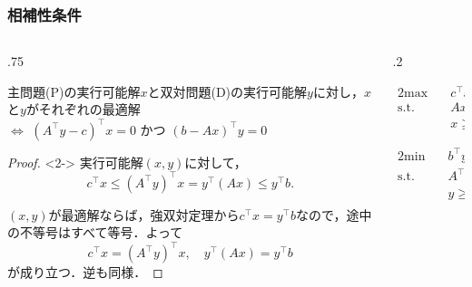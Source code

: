 \documentclass[14pt,aspectratio=169,xcolor=dvipsnames,table,onlytextwidth,dvipdfmx]{beamer}
\begin{document}
\begin{frame}
    \frametitle{相補性条件}

    \small
    \begin{columns}[T]
    \begin{column}{.75\textwidth}
    \begin{lemma}
        主問題(P)の実行可能解$x$と双対問題(D)の実行可能解$y$に対し，$x$と$y$がそれぞれの最適解 \\ 
        $\iff$ 
            $(A^\top y - c)^\top x = 0$
            かつ 
            $(b - Ax)^\top y = 0$  
    \end{lemma}

    \begin{proof}<2->
    実行可能解$(x,y)$に対して，
    \setlength{\abovedisplayskip}{4pt}
    \setlength{\belowdisplayskip}{4pt}
    \[
        c^\top x \leq (A^\top y)^\top x = y^\top (Ax) \leq y^\top b.
    \]
    
    \bigskip
    $(x,y)$が最適解ならば，強双対定理から$c^\top x = y^\top b$なので，途中の不等号はすべて等号．よって
    \[
        c^\top x = (A^\top y)^\top x, \quad y^\top (Ax) = y^\top b
    \]
    が成り立つ．逆も同様．
    \end{proof}
    \end{column}
    \begin{column}{.2\textwidth}
    \footnotesize
    \begin{primal}
        \setlength{\abovedisplayskip}{0pt}
        \begin{alignat*}{2}
            \text{max} & \quad  c^\top x \\
            \text{s.t.} & \quad A x \leq b  \\
            & \quad x \geq 0 
        \end{alignat*}
    \end{primal}
    \begin{dual}
        \setlength{\abovedisplayskip}{0pt}
        \begin{alignat*}{2}
            \text{min} & \quad  b^\top y \\
            \text{s.t.} & \quad A^\top y \geq c  \\
            & \quad y \geq 0 
        \end{alignat*}
    \end{dual}
    \end{column}
    \end{columns}
\end{frame}
\end{document}
